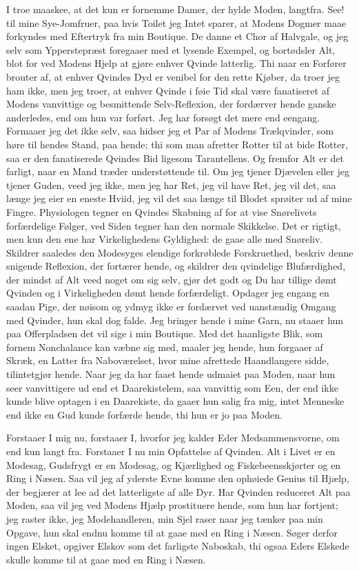 \documentclass[12pt,a4paper]{article}
\begin{document}
I troe maaskee, at det kun er fornemme Damer, der hylde Moden, langtfra. See! til mine Sye-Jomfruer, paa hvis Toilet jeg Intet sparer, at Modens Dogmer maae forkyndes med Eftertryk fra min Boutique. De danne et Chor af Halvgale, og jeg selv som Ypperstepræst foregaaer med et lysende Exempel, og bortødsler Alt, blot for ved Modens Hjelp at gjøre enhver Qvinde latterlig. Thi naar en Forfører brouter af, at enhver Qvindes Dyd er venibel for den rette Kjøber, da troer jeg ham ikke, men jeg troer, at enhver Qvinde i føie Tid skal være fanatiseret af Modens vanvittige og besmittende Selv-Reflexion, der fordærver hende ganske anderledes, end om hun var forført. Jeg har forsøgt det mere end eengang. Formaaer jeg det ikke selv, saa hidser jeg et Par af Modens Trælqvinder, som høre til hendes Stand, paa hende; thi som man afretter Rotter til at bide Rotter, saa er den fanatiserede Qvindes Bid ligesom Tarantellens. Og fremfor Alt er det farligt, naar en Mand træder understøttende til. Om jeg tjener Djævelen eller jeg tjener Guden, veed jeg ikke, men jeg har Ret, jeg vil have Ret, jeg vil det, saa længe jeg eier en eneste Hviid, jeg vil det saa længe til Blodet sprøiter ud af mine Fingre. Physiologen tegner en Qvindes Skabning af for at vise Snørelivets forfærdelige Følger, ved Siden tegner han den normale Skikkelse. Det er rigtigt, men kun den ene har Virkelighedens Gyldighed: de gaae alle med Snøreliv. Skildrer saaledes den Modesyges elendige forkrøblede Forskruethed, beskriv denne snigende Reflexion, der fortærer hende, og skildrer den qvindelige Blufærdighed, der mindst af Alt veed noget om sig selv, gjør det godt og Du har tillige dømt Qvinden og i Virkeligheden dømt hende forfærdeligt. Opdager jeg engang en saadan Pige, der nøisom og ydmyg ikke er fordærvet ved uanstændig Omgang med Qvinder, hun skal dog falde. Jeg bringer hende i mine Garn, nu staaer hun paa Offerpladsen det vil sige i min Boutique. Med det haanligste Blik, som fornem Nonchalance kan væbne sig med, maaler jeg hende, hun forgaaer af Skræk, en Latter fra Naboværelset, hvor mine afrettede Haandlangere sidde, tilintetgjør hende. Naar jeg da har faaet hende udmaiet paa Moden, naar hun seer vanvittigere ud end et Daarekistelem, saa vanvittig som Een, der end ikke kunde blive optagen i en Daarekiste, da gaaer hun salig fra mig, intet Menneske end ikke en Gud kunde forfærde hende, thi hun er jo paa Moden.

Forstaaer I mig nu, forstaaer I, hvorfor jeg kalder Eder Medsammensvorne, om end kun langt fra. Forstaaer I nu min Opfattelse af Qvinden. Alt i Livet er en Modesag, Gudsfrygt er en Modesag, og Kjærlighed og Fiskebeensskjørter og en Ring i Næsen. Saa vil jeg af yderste Evne komme den ophøiede Genius til Hjælp, der begjærer at lee ad det latterligste af alle Dyr. Har Qvinden reduceret Alt paa Moden, saa vil jeg ved Modens Hjælp prostituere hende, som hun har fortjent; jeg raster ikke, jeg Modehandleren, min Sjel raser naar jeg tænker paa min Opgave, hun skal endnu komme til at gaae med en Ring i Næsen. Søger derfor ingen Elsket, opgiver Elskov som det farligste Naboskab, thi ogsaa Eders Elskede skulle komme til at gaae med en Ring i Næsen.
\end{document}
